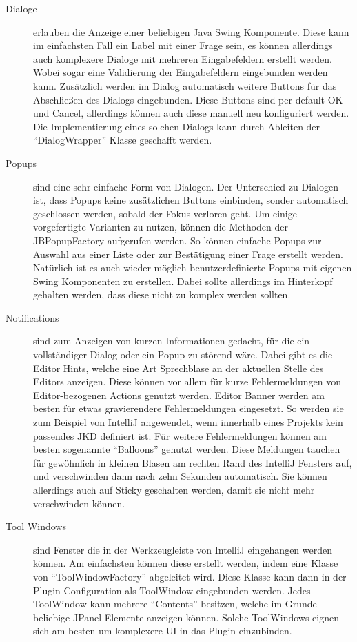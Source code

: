   \begin{description}
    \item[Dialoge] erlauben die Anzeige einer beliebigen Java Swing Komponente. 
      Diese kann im einfachsten Fall ein Label mit einer Frage sein, es können allerdings
      auch komplexere Dialoge mit mehreren Eingabefeldern erstellt werden. Wobei
      sogar eine Validierung der Eingabefeldern eingebunden werden kann. Zusätzlich
      werden im Dialog automatisch weitere Buttons für das Abschließen des Dialogs 
      eingebunden. Diese Buttons sind per default OK und Cancel, allerdings können auch
      diese manuell neu konfiguriert werden. Die Implementierung eines solchen Dialogs
      kann durch Ableiten der \enquote{DialogWrapper} Klasse geschafft werden.
    \item[Popups] sind eine sehr einfache Form von Dialogen. Der Unterschied zu Dialogen
      ist, dass Popups keine zusätzlichen Buttons einbinden, sonder automatisch 
      geschlossen werden, sobald der Fokus verloren geht. Um einige vorgefertigte 
      Varianten zu nutzen, können die Methoden der JBPopupFactory aufgerufen werden.
      So können einfache Popups zur Auswahl aus einer Liste oder zur Bestätigung einer
      Frage erstellt werden. Natürlich ist es auch wieder möglich benutzerdefinierte
      Popups mit eigenen Swing Komponenten zu erstellen. Dabei sollte allerdings im
      Hinterkopf gehalten werden, dass diese nicht zu komplex werden sollten.
    \item[Notifications] sind zum Anzeigen von kurzen Informationen gedacht, für die
      ein vollständiger Dialog oder ein Popup zu störend wäre. Dabei gibt es die 
      Editor Hints, welche eine Art Sprechblase an der aktuellen Stelle des Editors
      anzeigen. Diese können vor allem für kurze Fehlermeldungen von Editor-bezogenen
      Actions genutzt werden. Editor Banner werden am besten für etwas gravierendere
      Fehlermeldungen eingesetzt. So werden sie zum Beispiel von IntelliJ angewendet, 
      wenn innerhalb eines Projekts kein passendes JKD definiert ist. Für weitere
      Fehlermeldungen können am besten sogenannte \enquote{Balloons} genutzt werden.
      Diese Meldungen tauchen für gewöhnlich in kleinen Blasen am rechten Rand
      des IntelliJ Fensters auf, und verschwinden dann nach zehn Sekunden automatisch.
      Sie können allerdings auch auf Sticky geschalten werden, damit sie nicht mehr
      verschwinden können.
    \item[Tool Windows] sind Fenster die in der Werkzeugleiste von IntelliJ eingehangen
      werden können. Am einfachsten können diese erstellt werden, indem eine Klasse
      von \enquote{ToolWindowFactory} abgeleitet wird. Diese Klasse kann dann 
      in der Plugin Configuration als ToolWindow eingebunden werden. Jedes ToolWindow
      kann mehrere \enquote{Contents} besitzen, welche im Grunde beliebige JPanel 
      Elemente anzeigen können. Solche ToolWindows eignen sich am besten um komplexere
      UI in das Plugin einzubinden.
  \end{description}

